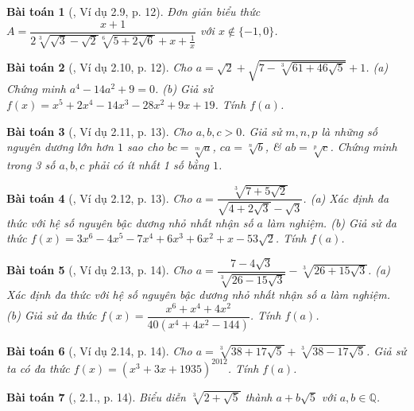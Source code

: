 \documentclass{article}
\newtheorem{baitoan}{Bài toán}
\begin{document}
\begin{baitoan}[\cite{TLCT_THCS_Toan_9_dai_so}, Ví dụ 2.9, p. 12]
	Đơn giản biểu thức $A = \dfrac{x + 1}{2\sqrt[3]{\sqrt{3} - \sqrt{2}}\sqrt[6]{5 + 2\sqrt{6}} + x + \frac{1}{x}}$ với $x\notin\{-1,0\}$.
\end{baitoan}

\begin{baitoan}[\cite{TLCT_THCS_Toan_9_dai_so}, Ví dụ 2.10, p. 12]
	Cho $a = \sqrt{2} + \sqrt{7 - \sqrt[3]{61 + 46\sqrt{5}}} + 1$. (a) Chứng minh $a^4 - 14a^2 + 9 = 0$. (b) Giả sử $f(x) = x^5 + 2x^4 - 14x^3 - 28x^2 + 9x + 19$. Tính $f(a)$.
\end{baitoan}

\begin{baitoan}[\cite{TLCT_THCS_Toan_9_dai_so}, Ví dụ 2.11, p. 13]
	Cho $a,b,c > 0$. Giả sử $m,n,p$ là những số nguyên dương lớn hơn $1$ sao cho $bc = \sqrt[m]{a}$, $ca = \sqrt[n]{b}$, \& $ab = \sqrt[p]{c}$. Chứng minh trong 3 số $a,b,c$ phải có ít nhất 1 số bằng $1$.
\end{baitoan}

\begin{baitoan}[\cite{TLCT_THCS_Toan_9_dai_so}, Ví dụ 2.12, p. 13]
	Cho $a = \dfrac{\sqrt[3]{7 + 5\sqrt{2}}}{\sqrt{4 + 2\sqrt{3}} - \sqrt{3}}$. (a) Xác định đa thức với hệ số nguyên bậc dương nhỏ nhất nhận số $a$ làm nghiệm. (b) Giả sử đa thức $f(x) = 3x^6 - 4x^5 - 7x^4 + 6x^3 + 6x^2 + x - 53\sqrt{2}$. Tính $f(a)$.
\end{baitoan}

\begin{baitoan}[\cite{TLCT_THCS_Toan_9_dai_so}, Ví dụ 2.13, p. 14]
	Cho $a = \dfrac{7- 4\sqrt{3}}{\sqrt[3]{26 - 15\sqrt{3}}} - \sqrt[3]{26 + 15\sqrt{3}}$. (a) Xác định đa thức với hệ số nguyên bậc dương nhỏ nhất nhận số $a$ làm nghiệm. (b) Giả sử đa thức $f(x) = \dfrac{x^6 + x^4 + 4x^2}{40(x^4 + 4x^2 - 144)}$. Tính $f(a)$.
\end{baitoan}

\begin{baitoan}[\cite{TLCT_THCS_Toan_9_dai_so}, Ví dụ 2.14, p. 14]
	Cho $a = \sqrt[3]{38 + 17\sqrt{5}} + \sqrt[3]{38 - 17\sqrt{5}}$. Giả sử ta có đa thức $f(x) = (x^3 + 3x + 1935)^{2012}$. Tính $f(a)$.
\end{baitoan}

\begin{baitoan}[\cite{TLCT_THCS_Toan_9_dai_so}, 2.1., p. 14]
	Biểu diễn $\sqrt[3]{2 + \sqrt{5}}$ thành $a + b\sqrt{5}$ với $a,b\in\mathbb{Q}$.
\end{baitoan}
\end{document}
